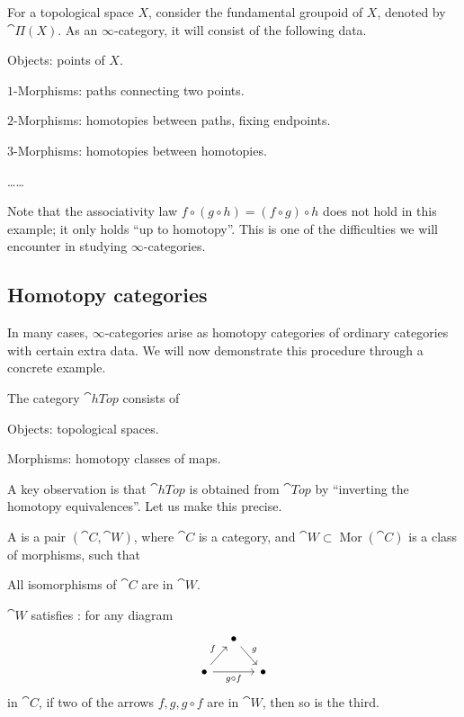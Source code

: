 \begin{example}
    For a topological space $X$, consider the fundamental groupoid of $X$, denoted by $\cat{Π}(X)$.
    As an $\infty$-category, it will consist of the following data.
    \begin{itms}
        \item Objects: points of $X$.
        \item $1$-Morphisms: paths connecting two points.
        \item $2$-Morphisms: homotopies between paths, fixing endpoints.
        \item $3$-Morphisms: homotopies between homotopies.
        \item \dots\dots
    \end{itms}
    Note that the associativity law $f\circ(g\circ h)=(f\circ g)\circ h$
    does not hold in this example; it only holds ``up to homotopy''.
    This is one of the difficulties we will encounter in studying $\infty$-categories.
    \varqed
\end{example}

\subsection{Homotopy categories}

In many cases, $\infty$-categories arise as homotopy categories of ordinary categories with certain extra data.
We will now demonstrate this procedure through a concrete example.

\begin{definition}
    The category $\cat{hTop}$ consists of
    \begin{itms}
        \item Objects: topological spaces.
        \item Morphisms: homotopy classes of maps.
    \end{itms}
\end{definition}

A key observation is that $\cat{hTop}$ is obtained from $\cat{Top}$
by ``inverting the homotopy equivalences''. Let us make this precise.

\begin{definition}
    A 
    is a pair $(\cat{C},\cat{W})$,
    where $\cat{C}$ is a category,
    and $\cat{W}\subset\operatorname{Mor}(\cat C)$ is a class of morphisms, such that
    \begin{itms}
        \item All isomorphisms of $\cat{C}$ are in $\cat{W}$.
        \item $\cat{W}$ satisfies : for any diagram
        \[ \begin{tikzcd}[column sep=10pt,row sep=15pt]
            & \bullet\ar[rd,"g"] &   \\
            \bullet\ar[rr,"g\circ f"']\ar[ru,"f"] &   & \bullet 
        \end{tikzcd} \]
        in $\cat{C}$, if two of the arrows $f,g,g\circ f$ are in $\cat{W}$, then so is the third.
    \end{itms}
\end{definition}

